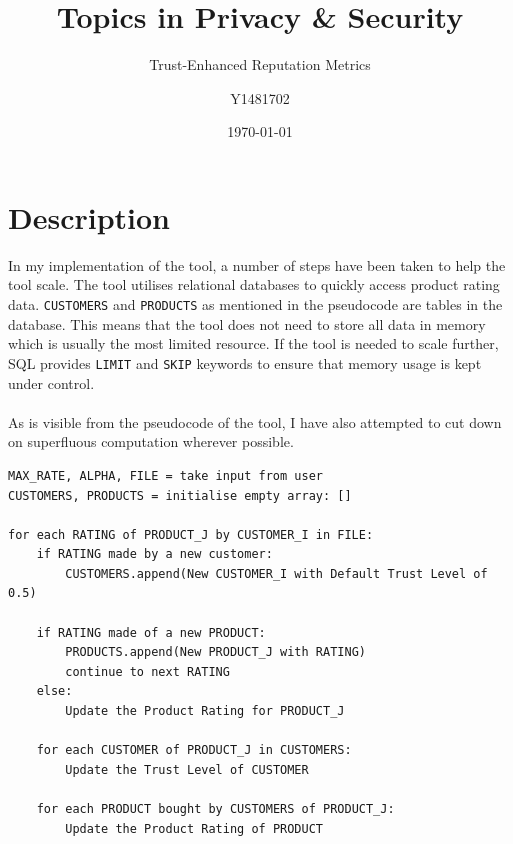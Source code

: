 \documentclass{article}
\title{Topics in Privacy \& Security}
\subtitle{Trust-Enhanced Reputation Metrics}
\author{Y1481702}
\date{\today}
\begin{document}
\begin{titlepage}
\maketitle
\tableofcontents
\end{titlepage}



\section{Description} %
In my implementation of the tool, a number of steps have been taken to help the tool scale.
The tool utilises relational databases to quickly access product rating data. \texttt{CUSTOMERS} and \texttt{PRODUCTS} as mentioned in the pseudocode are tables in the database. This means that the tool does not need to store all data in memory which is usually the most limited resource.
If the tool is needed to scale further, SQL provides \texttt{LIMIT} and \texttt{SKIP} keywords to ensure that memory usage is kept under control.
\\\\
As is visible from the pseudocode of the tool, I have also attempted to cut down on superfluous computation wherever possible.
\begin{lstlisting}
MAX_RATE, ALPHA, FILE = take input from user
CUSTOMERS, PRODUCTS = initialise empty array: []

for each RATING of PRODUCT_J by CUSTOMER_I in FILE:
	if RATING made by a new customer:
		CUSTOMERS.append(New CUSTOMER_I with Default Trust Level of 0.5)

	if RATING made of a new PRODUCT:
		PRODUCTS.append(New PRODUCT_J with RATING)
		continue to next RATING
	else:
		Update the Product Rating for PRODUCT_J

	for each CUSTOMER of PRODUCT_J in CUSTOMERS:
		Update the Trust Level of CUSTOMER

	for each PRODUCT bought by CUSTOMERS of PRODUCT_J:
		Update the Product Rating of PRODUCT

\end{lstlisting}
\end{document}
